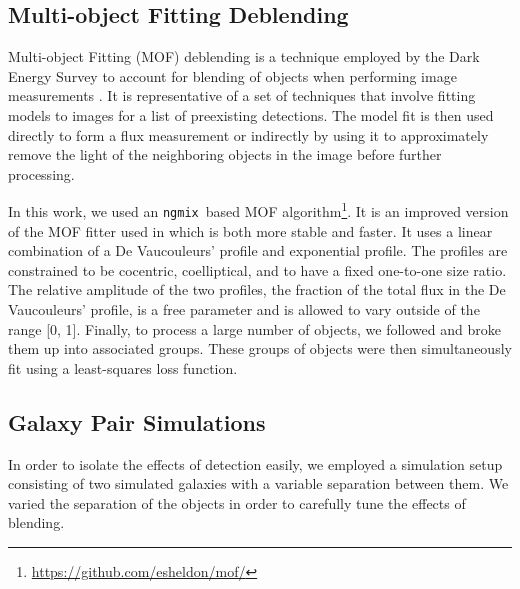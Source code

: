 \documentclass[fleqn,useAMS,usenatbib]{mnras}
\newcommand{\ngmix}{\texttt{ngmix}}
\begin{document}
\subsection{Multi-object Fitting Deblending}

Multi-object Fitting (MOF) deblending is a technique employed by the Dark
Energy Survey to account for blending of objects when performing image
measurements \citep{DESY1cat}. It is representative of a set of techniques that
involve fitting models to images for a list of preexisting detections. The
model fit is then used directly to form a flux measurement or indirectly by
using it to approximately remove the light of the neighboring objects in the
image before further processing.

In this work, we used an \ngmix\ based MOF
algorithm\footnote{\url{https://github.com/esheldon/mof/}}. It is an improved
version of the MOF fitter used in \cite{DESY1cat} which is
both more stable and faster. It uses a linear combination of a De Vaucouleurs'
\citep{devauc1948} profile and exponential profile. The profiles are
constrained to be cocentric, coelliptical, and to have a fixed one-to-one size
ratio.  The relative amplitude of the two profiles, the fraction of the total
flux in the De Vaucouleurs' profile, is a free parameter and is allowed to vary
outside of the range [0, 1]. Finally, to process a large number of objects, we
followed \citet{DESY1cat} and broke them up into associated groups.  These
groups of objects were then simultaneously fit using a least-squares loss
function.

\subsection{Galaxy Pair Simulations}
\label{sec:sims:pairs}

In order to isolate the effects of detection easily, we employed a simulation
setup consisting of two simulated galaxies with a variable separation between
them.  We varied the separation of the objects in order to carefully tune the
effects of blending.
\end{document}
